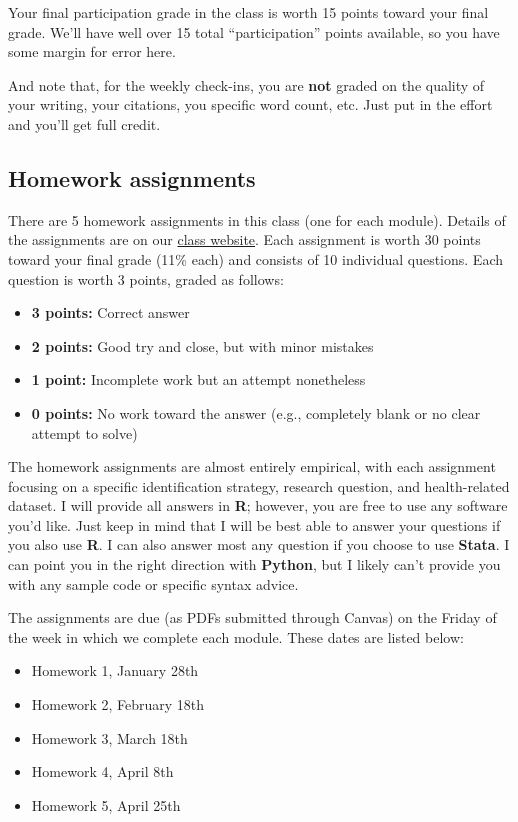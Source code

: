 \documentclass[11pt,]{article}
\providecommand{\tightlist}{%
  \setlength{\itemsep}{0pt}\setlength{\parskip}{0pt}}
\begin{document}
Your final participation grade in the class is worth 15 points toward
your final grade. We'll have well over 15 total ``participation'' points
available, so you have some margin for error here.

And note that, for the weekly check-ins, you are \textbf{not} graded on
the quality of your writing, your citations, you specific word count,
etc. Just put in the effort and you'll get full credit.

\hypertarget{homework-assignments}{%
\subsection{Homework assignments}\label{homework-assignments}}

There are 5 homework assignments in this class (one for each module).
Details of the assignments are on our
\href{https://econ470s22.classes.ianmccarthyecon.com/}{class website}.
Each assignment is worth 30 points toward your final grade (11\% each)
and consists of 10 individual questions. Each question is worth 3
points, graded as follows:

\begin{itemize}
\tightlist
\item
  \textbf{3 points:} Correct answer
\item
  \textbf{2 points:} Good try and close, but with minor mistakes
\item
  \textbf{1 point:} Incomplete work but an attempt nonetheless
\item
  \textbf{0 points:} No work toward the answer (e.g., completely blank
  or no clear attempt to solve)
\end{itemize}

The homework assignments are almost entirely empirical, with each
assignment focusing on a specific identification strategy, research
question, and health-related dataset. I will provide all answers in
\textbf{R}; however, you are free to use any software you'd like. Just
keep in mind that I will be best able to answer your questions if you
also use \textbf{R}. I can also answer most any question if you choose
to use \textbf{Stata}. I can point you in the right direction with
\textbf{Python}, but I likely can't provide you with any sample code or
specific syntax advice.

The assignments are due (as PDFs submitted through Canvas) on the Friday
of the week in which we complete each module. These dates are listed
below:

\begin{itemize}
\tightlist
\item
  Homework 1, January 28th
\item
  Homework 2, February 18th
\item
  Homework 3, March 18th
\item
  Homework 4, April 8th
\item
  Homework 5, April 25th
\end{itemize}
\end{document}
